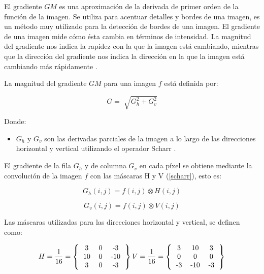 El gradiente $GM$ es una aproximación de la derivada de primer orden de la función de la imagen. Se utiliza para acentuar detalles y bordes de una imagen, es un método muy utilizado para la detección de bordes de una imagen. El gradiente de una imagen mide cómo ésta cambia en términos de intensidad. La magnitud del gradiente nos indica la rapidez con la que la imagen está cambiando, mientras que la dirección del gradiente nos indica la dirección en la que la imagen está cambiando más rápidamente \cite{esquedagradiente}.

La magnitud del gradiente $GM$ para una imagen $f$ está definida por:

\begin{equation}\label{eq:gm}
G = \sqrt[]{G_{h}^{2} + G_{v}^{2}}
\end{equation}

Donde: 
\begin{itemize}
\item $G_{h}$ y  $G_{v}$ son las derivadas parciales de la imagen a lo largo de las direcciones horizontal y vertical utilizando el operador Scharr \cite{jahne1999handbook}.
\end{itemize}
 

El gradiente de la fila $G_h$ y de columna $G_v$ en cada píxel se obtiene mediante la convolución de la imagen $f$ con las máscaras H y V (\ref{scharr}), esto es: 


\begin{equation}\label{gh}
    G_h(i,j) = f(i,j) \otimes{} H(i,j)
\end{equation}

\begin{equation}\label{gv}
    G_v(i,j) = f(i,j) \otimes{} V(i,j)
\end{equation}

Las máscaras utilizadas para las direcciones horizontal y vertical, se definen como:

\begin{equation}\label{scharr}
  H = \frac{1}{16} = \left\{{\begin{tabular}{ccc}
  3 & 0 & -3 \\
  10 & 0 & -10 \\
  3 & 0 & -3 
  \end{tabular}}\right\} 
  V = \frac{1}{16} = \left\{{\begin{tabular}{ccc}
  3 & 10 & 3 \\
  0 & 0 & 0 \\
  -3 & -10 & -3 
  \end{tabular}}\right\}
\end{equation}

